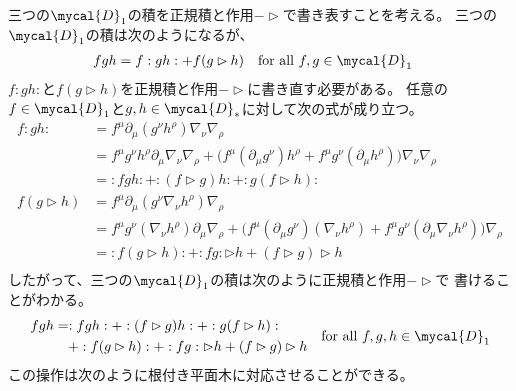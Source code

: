 三つの$\mycal{D}_1$の積を正規積と作用$-\rhd$で書き表すことを考える。
三つの$\mycal{D}_1$の積は次のようになるが、
\begin{equation*}\begin{split} %
	fgh &= f:gh: + f(g\rhd h) \quad\text{for all }f,g\in\mycal{D}_1
\end{split}\end{equation*} %
$f:gh:$と$f(g\rhd h)$を正規積と作用$-\rhd$に書き直す必要がある。
任意の$f\in\mycal{D}_1$と$g,h\in\mycal{D}_*$に対して次の式が成り立つ。
\begin{equation*}\begin{split} %
	f:gh: &= f^\mu\partial_\mu(g^\nu h^\rho)\nabla_\nu\nabla_\rho \\
	&= f^\mu g^\nu h^\rho \partial_\mu\nabla_\nu\nabla_\rho
		+ \biggl(f^\mu(\partial_\mu g^\nu)h^\rho
		+ f^\mu g^\nu(\partial_\mu h^\rho)\biggr)\nabla_\nu\nabla_\rho \\
	&= :fgh: + :(f\rhd g)h: + :g(f\rhd h): \\
	f(g\rhd h) &= f^\mu\partial_\mu(g^\nu\nabla_\nu h^\rho)\nabla_\rho \\
	&= f^\mu g^\nu(\nabla_\nu h^\rho)\partial_\mu\nabla_\rho
		+ \biggl(f^\mu(\partial_\mu g^\nu)(\nabla_\nu h^\rho)
		+ f^\mu g^\nu(\partial_\mu\nabla_\nu h^\rho)\biggr)\nabla_\rho \\
	&= :f(g\rhd h): + :fg:\rhd h + (f\rhd g)\rhd h \\
\end{split}\end{equation*} %
したがって、三つの$\mycal{D}_1$の積は次のように正規積と作用$-\rhd$で
書けることがわかる。
\begin{equation*}\begin{split} %
	fgh &= :fgh: + :(f\rhd g)h: + :g(f\rhd h): \\
		&\quad + :f(g\rhd h): + :fg:\rhd h + (f\rhd g)\rhd h
\end{split}
		\quad\text{for all }f,g,h\in\mycal{D}_1
\end{equation*} %
この操作は次のように根付き平面木に対応させることができる。

